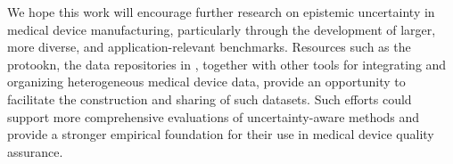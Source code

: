 We hope this work will encourage further research on epistemic uncertainty in medical device manufacturing, particularly through the development of larger, more diverse, and application-relevant benchmarks. Resources such as the \gls*{protookn}, the data repositories in \cite{fda_510k,fda_maude}, together with other tools for integrating and organizing heterogeneous medical device data, provide an opportunity to facilitate the construction and sharing of such datasets. Such efforts could support more comprehensive evaluations of uncertainty-aware methods and provide a stronger empirical foundation for their use in medical device quality assurance.